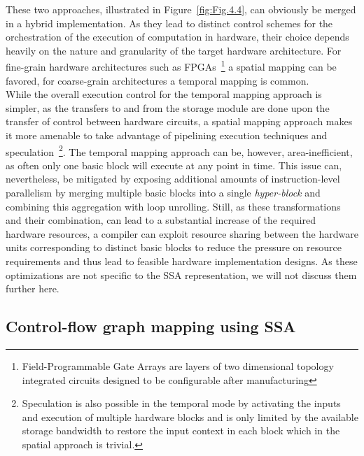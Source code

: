 These two approaches, illustrated in Figure~\ref{fig:Fig.4.4}, can 
obviously be merged in a hybrid implementation. As they lead to distinct
control schemes for the orchestration of the execution of
computation in hardware, their choice depends heavily
on the nature and granularity of the target hardware architecture. 
For fine-grain hardware architectures such as FPGAs~\footnote{Field-Programmable Gate Arrays are layers of two dimensional topology integrated circuits designed to be configurable after manufacturing} a spatial
mapping can be favored, for coarse-grain architectures a
temporal mapping is common.\\

While the overall execution control for the temporal mapping
approach is simpler, as the transfers to and from the storage module are done upon the transfer of control between hardware circuits,
a spatial mapping approach makes it more amenable to 
take advantage of pipelining execution techniques and 
speculation~\footnote{Speculation is also possible in 
the temporal mode by activating the inputs and execution 
of multiple hardware blocks and is only limited by the 
available storage bandwidth to restore the input context 
in each block which in the spatial approach is trivial.}.
The temporal mapping approach can be, however, 
area-inefficient, as often only one basic block will
execute at any point in time. 
This issue can, nevertheless, be mitigated by exposing
additional amounts of instruction-level parallelism by
merging multiple basic blocks into a single {\em hyper-block}
and combining this aggregation with loop unrolling. 
Still, as these transformations and their combination, can
lead to a substantial increase of the required hardware
resources, a compiler can exploit resource sharing
between the hardware units  corresponding to distinct
basic blocks to reduce the pressure on resource
requirements and thus lead to feasible hardware
implementation designs. 
As these optimizations are not specific to the SSA representation, 
we will not discuss them further here. \\


\subsection{Control-flow graph mapping using SSA}
\label{sec:cfg_ssa_mapping}

